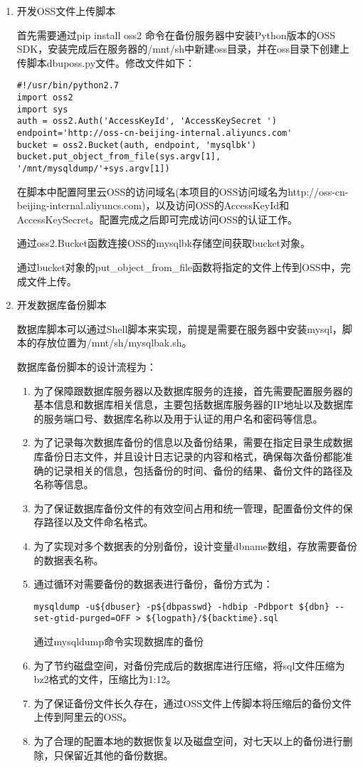 \begin{enumerate}
\item 开发OSS文件上传脚本

首先需要通过pip install oss2 命令在备份服务器中安装Python版本的OSS SDK，安装完成后在服务器的/mnt/sh中新建oss目录，并在oss目录下创建上传脚本dbuposs.py文件。修改文件如下：
\begin{lstlisting}[numbers=none]
#!/usr/bin/python2.7
import oss2
import sys
auth = oss2.Auth('AccessKeyId', 'AccessKeySecret ')
endpoint='http://oss-cn-beijing-internal.aliyuncs.com'
bucket = oss2.Bucket(auth, endpoint, 'mysqlbk')
bucket.put_object_from_file(sys.argv[1], '/mnt/mysqldump/'+sys.argv[1])
\end{lstlisting}
在脚本中配置阿里云OSS的访问域名(本项目的OSS访问域名为http://oss-cn-beijing-internal.aliyuncs.com)，以及访问OSS的AccessKeyId和AccessKeySecret。配置完成之后即可完成访问OSS的认证工作。

通过oss2.Bucket函数连接OSS的mysqlbk存储空间获取bucket对象。

通过bucket对象的put\_object\_from\_file函数将指定的文件上传到OSS中，完成文件上传。
\item 开发数据库备份脚本

数据库脚本可以通过Shell脚本来实现，前提是需要在服务器中安装mysql，脚本的存放位置为/mnt/sh/mysqlbak.sh。

数据库备份脚本的设计流程为：
\begin{enumerate}
  \item 为了保障跟数据库服务器以及数据库服务的连接，首先需要配置服务器的基本信息和数据库相关信息，主要包括数据库服务器的IP地址以及数据库的服务端口号、数据库名称以及用于认证的用户名和密码等信息。
  \item 为了记录每次数据库备份的信息以及备份结果，需要在指定目录生成数据库备份日志文件，并且设计日志记录的内容和格式，确保每次备份都能准确的记录相关的信息，包括备份的时间、备份的结果、备份文件的路径及名称等信息。
  \item 为了保证数据库备份文件的有效空间占用和统一管理，配置备份文件的保存路径以及文件命名格式。
  \item 为了实现对多个数据表的分别备份，设计变量dbname数组，存放需要备份的数据表名称。
  \item 通过循环对需要备份的数据表进行备份，备份方式为：
  \begin{lstlisting}[numbers=none]
  mysqldump -u${dbuser} -p${dbpasswd} -hdbip -Pdbport ${dbn} --set-gtid-purged=OFF > ${logpath}/${backtime}.sql
  \end{lstlisting}
  通过mysqldump命令实现数据库的备份
  \item 为了节约磁盘空间，对备份完成后的数据库进行压缩，将sql文件压缩为bz2格式的文件，压缩比为1:12。
  \item 为了保证备份文件长久存在，通过OSS文件上传脚本将压缩后的备份文件上传到阿里云的OSS。
  \item 为了合理的配置本地的数据恢复以及磁盘空间，对七天以上的备份进行删除，只保留近其他的备份数据。
\end{enumerate}


\end{enumerate}
